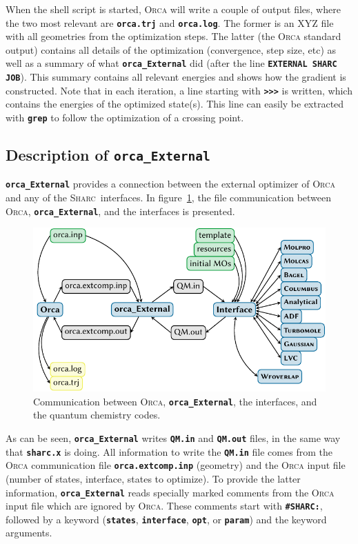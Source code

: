 \documentclass[a4paper,10pt,DIV=15,openany,twoside=false]{scrbook}
\newcommand{\sharc}{\textsc{Sharc}}
\newcommand{\ttt}[1]{\textbf{\texttt{#1}}}
\begin{document}
When the shell script is started, \textsc{Orca} will write a couple of output files, where the two most relevant are \ttt{orca.trj} and \ttt{orca.log}.
The former is an XYZ file with all geometries from the optimization steps.
The latter (the \textsc{Orca} standard output) contains all details of the optimization (convergence, step size, etc) as well as a summary of what \ttt{orca\_External} did (after the line \ttt{EXTERNAL SHARC JOB}).
This summary contains all relevant energies and shows how the gradient is constructed.
Note that in each iteration, a line starting with \ttt{\textgreater\textgreater\textgreater} is written, which contains the energies of the optimized state(s). This line can easily be extracted with \ttt{grep} to follow the optimization of a crossing point.

\subsection{Description of \ttt{orca\_External}}

\ttt{orca\_External} provides a connection between the external optimizer of \textsc{Orca} and any of the \sharc\ interfaces.
In figure~\ref{fig:interface_orcaExt}, the file communication between \textsc{Orca}, \ttt{orca\_External}, and the interfaces is presented.

\begin{figure}[htb]
  \centering
  \includegraphics[scale=1]{img/interfaces/general_orcaExternal.pdf}
  \caption{Communication between \textsc{Orca}, \ttt{orca\_External}, the interfaces, and the quantum chemistry codes.}
  \label{fig:interface_orcaExt}
\end{figure}

As can be seen, \ttt{orca\_External} writes \ttt{QM.in} and \ttt{QM.out} files, in the same way that \ttt{sharc.x} is doing.
All information to write the \ttt{QM.in} file comes from the \textsc{Orca} communication file \ttt{orca.extcomp.inp} (geometry) and the \textsc{Orca} input file (number of states, interface, states to optimize).
To provide the latter information, \ttt{orca\_External} reads specially marked comments from the \textsc{Orca} input file which are ignored by \textsc{Orca}.
These comments start with \ttt{\#SHARC:}, followed by a keyword (\ttt{states}, \ttt{interface}, \ttt{opt}, or \ttt{param}) and the keyword arguments.
\end{document}
